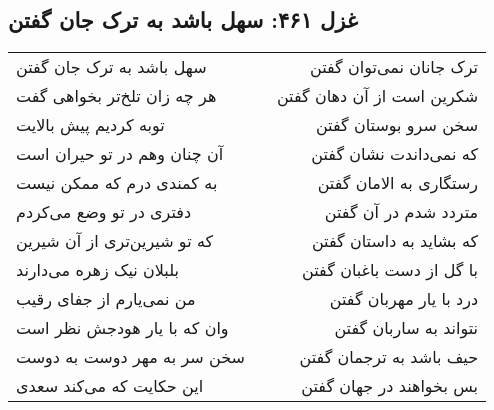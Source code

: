 \begin{center}
\section*{غزل ۴۶۱: سهل باشد به ترک جان گفتن}
\label{sec:461}
\begin{longtable}{l p{0.5cm} r}
سهل باشد به ترک جان گفتن
&&
ترک جانان نمی‌توان گفتن
\\
هر چه زان تلخ‌تر بخواهی گفت
&&
شکرین است از آن دهان گفتن
\\
توبه کردیم پیش بالایت
&&
سخن سرو بوستان گفتن
\\
آن چنان وهم در تو حیران است
&&
که نمی‌داندت نشان گفتن
\\
به کمندی درم که ممکن نیست
&&
رستگاری به الامان گفتن
\\
دفتری در تو وضع می‌کردم
&&
متردد شدم در آن گفتن
\\
که تو شیرین‌تری از آن شیرین
&&
که بشاید به داستان گفتن
\\
بلبلان نیک زهره می‌دارند
&&
با گل از دست باغبان گفتن
\\
من نمی‌یارم از جفای رقیب
&&
درد با یار مهربان گفتن
\\
وان که با یار هودجش نظر است
&&
نتواند به ساربان گفتن
\\
سخن سر به مهر دوست به دوست
&&
حیف باشد به ترجمان گفتن
\\
این حکایت که می‌کند سعدی
&&
بس بخواهند در جهان گفتن
\\
\end{longtable}
\end{center}

